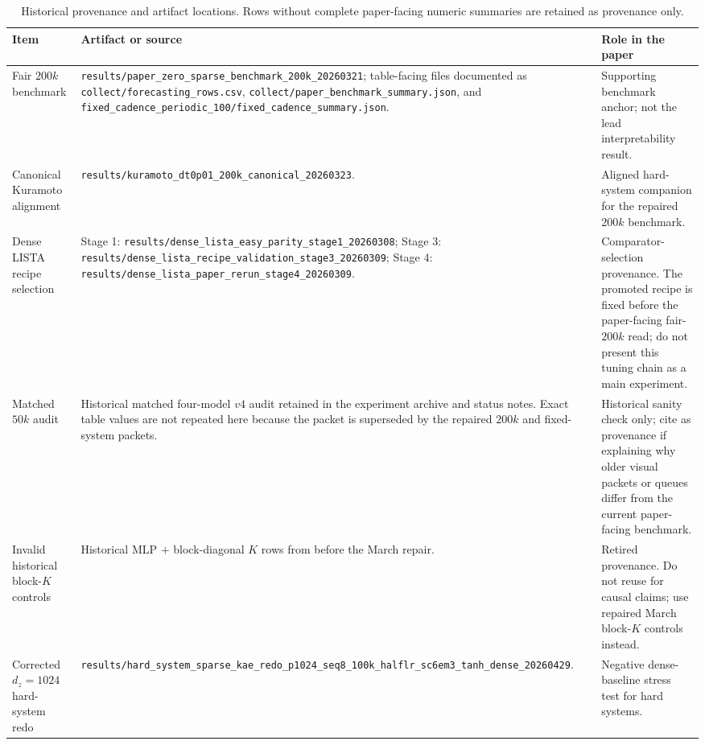 \begin{table}[tbp]
\centering
\caption{Historical provenance and artifact locations. Rows without complete
paper-facing numeric summaries are retained as provenance only.}
\label{tab:a6_historical_artifacts}
\scriptsize
\begin{tabular}{@{}p{}p{}p{}@{}}
\toprule
Item & Artifact or source & Role in the paper \\
\midrule
Fair \(200k\) benchmark &
\texttt{results/paper\_zero\_sparse\_benchmark\_200k\_20260321};
table-facing files documented as
\texttt{collect/forecasting\_rows.csv},
\texttt{collect/paper\_benchmark\_summary.json}, and
\texttt{fixed\_cadence\_periodic\_100/fixed\_cadence\_summary.json}. &
Supporting benchmark anchor; not the lead interpretability result. \\
\addlinespace
Canonical Kuramoto alignment &
\texttt{results/kuramoto\_dt0p01\_200k\_canonical\_20260323}. &
Aligned hard-system companion for the repaired \(200k\) benchmark. \\
\addlinespace
Dense LISTA recipe selection &
Stage 1:
\texttt{results/dense\_lista\_easy\_parity\_stage1\_20260308};
Stage 3:
\texttt{results/dense\_lista\_recipe\_validation\_stage3\_20260309};
Stage 4:
\texttt{results/dense\_lista\_paper\_rerun\_stage4\_20260309}. &
Comparator-selection provenance. The promoted recipe is fixed before the
paper-facing fair-\(200k\) read; do not present this tuning chain as a main
experiment. \\
\addlinespace
Matched \(50k\) audit &
Historical matched four-model \(v4\) audit retained in the experiment archive
and status notes. Exact table values are not repeated here because the packet
is superseded by the repaired \(200k\) and fixed-system packets. &
Historical sanity check only; cite as provenance if explaining why older
visual packets or queues differ from the current paper-facing benchmark. \\
\addlinespace
Invalid historical block-\(K\) controls &
Historical MLP \(+\) block-diagonal \(K\) rows from before the March repair. &
Retired provenance. Do not reuse for causal claims; use repaired March
block-\(K\) controls instead. \\
\addlinespace
Corrected \(d_z=1024\) hard-system redo &
\texttt{results/hard\_system\_sparse\_kae\_redo\_p1024\_seq8\_100k\_halflr\_sc6em3\_tanh\_dense\_20260429}. &
Negative dense-baseline stress test for hard systems. \\
\bottomrule
\end{tabular}
\end{table}
